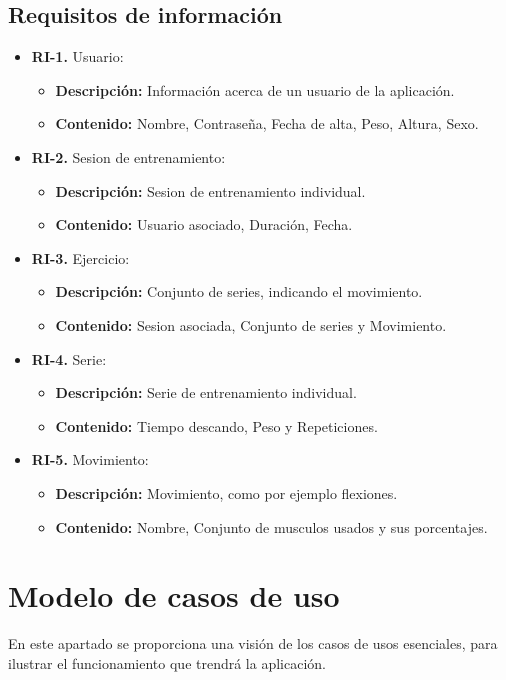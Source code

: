 \subsection{Requisitos de información}
\begin{itemize}
  \item \textbf{RI-1.} Usuario:
  \begin{itemize}
    \item \textbf{Descripción:} Información acerca de un usuario de la aplicación.
    
    \item \textbf{Contenido:} Nombre, Contraseña, Fecha de alta, Peso, Altura, Sexo.
  \end{itemize}
  \item \textbf{RI-2.} Sesion de entrenamiento:
    \begin{itemize}
    \item \textbf{Descripción:} Sesion de entrenamiento individual.
    \item \textbf{Contenido:} Usuario asociado, Duración, Fecha.
  \end{itemize}
  \item \textbf{RI-3.} Ejercicio:
    \begin{itemize}
    \item \textbf{Descripción:}  Conjunto de series, indicando el movimiento.
    \item \textbf{Contenido:}  Sesion asociada, Conjunto de series y Movimiento.
  \end{itemize}
  \item \textbf{RI-4.} Serie:
    \begin{itemize}
    \item \textbf{Descripción:} Serie de entrenamiento individual.
    \item \textbf{Contenido:} Tiempo descando, Peso y  Repeticiones.
  \end{itemize}
  \item \textbf{RI-5.} Movimiento:
    \begin{itemize}
    \item \textbf{Descripción:}  Movimiento, como por ejemplo flexiones.
    \item \textbf{Contenido:}  Nombre, Conjunto de musculos usados y sus porcentajes.
  \end{itemize}
\end{itemize}

\section {Modelo de casos de uso}
En este apartado se proporciona una visión de los casos de usos esenciales, para ilustrar el funcionamiento que trendrá la aplicación.
